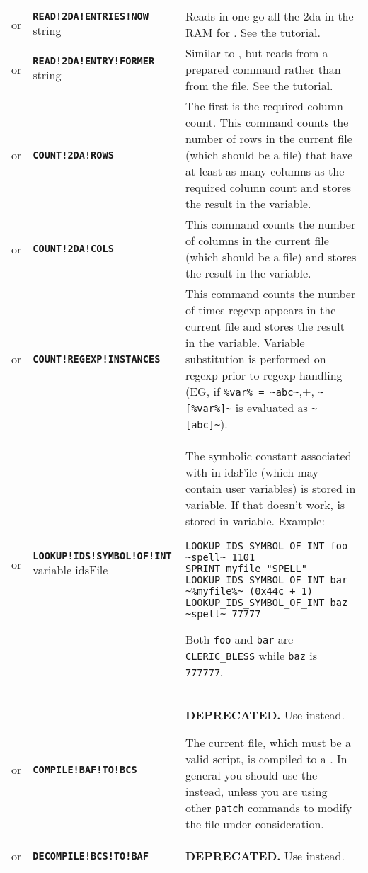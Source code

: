 \documentclass{article}
\def\ttref#1{\ahrefloc{#1}{\tt #1}}
\def\DEFINE#1{{\tt \bf #1}\label{#1}\index{#1}}
\def\DEFSYN#1{{\tt \bf #1}\index{#1}}
\def\t#1{{\tt #1}}
\begin{document}
\begin{tabular}{cp{10in}|p{10in}}
or & \DEFSYN{READ!2DA!ENTRIES!NOW} string \ttref{value} &
  Reads in one go all the 2da in the RAM for \ttref{READ!2DA!ENTRY!FORMER}. See the
  \ttref{READ!2DA!ENTRIES!NOW} tutorial. \\
or & \DEFSYN{READ!2DA!ENTRY!FORMER} string \ttref{value} \ttref{value} \ttref{variable}
  & Similar to \ttref{READ!2DA!ENTRY}, but reads from a prepared
  \ttref{READ!2DA!ENTRIES!NOW} command rather than from the file.
  See the \ttref{READ!2DA!ENTRY!FORMER} tutorial. \\
or & \DEFINE{COUNT!2DA!ROWS} \ttref{value} \ttref{variable} &
  The first \ttref{value} is the required column count. This command
  counts the number of rows in the current file (which should be a
  \ttref{2DA} file) that have at least as many columns as the required
  column count and stores the result in the variable. \\
or & \DEFINE{COUNT!2DA!COLS} \ttref{variable} &
  This command counts the number of columns in the current file (which should be a
  \ttref{2DA} file) and stores the result in the variable. \\
or & \DEFINE{COUNT!REGEXP!INSTANCES} \ttref{optcase} \ttref{optexact} \ttref{regexp}
    \ttref{variable} &
  This command counts the number of times regexp appears in the current file
  and stores the result in the variable. Variable substitution is performed
  on regexp prior to regexp handling (EG, if \verb+%var% = ~abc~+,
  \verb+~[%var%]~+ is evaluated as \verb+~[abc]~+). \\

or & \DEFINE{LOOKUP!IDS!SYMBOL!OF!INT} variable idsFile \ttref{value} &
  The symbolic constant associated with \ttref{value} in idsFile (which may
  contain user variables) is stored
  in variable. If that doesn't work, \ttref{value} is stored in variable.
  Example:
\begin{verbatim}
LOOKUP_IDS_SYMBOL_OF_INT foo ~spell~ 1101
SPRINT myfile "SPELL"
LOOKUP_IDS_SYMBOL_OF_INT bar ~%myfile%~ (0x44c + 1)
LOOKUP_IDS_SYMBOL_OF_INT baz ~spell~ 77777
\end{verbatim}
  Both \t{foo} and \t{bar} are \t{CLERIC\_BLESS} while \t{baz} is
  \t{777777}. \\

or & \DEFINE{COMPILE!BAF!TO!BCS} &
\textbf{DEPRECATED.} Use \ttref{DECOMPILE!AND!PATCH} instead.

  The current file, which must be a valid \ttref{BAF} script, is compiled
  to a \ttref{BCS}. In general you should use the \ttref{COMPILE}
  \ttref{TP2 Action} instead, unless you are using other \t{patch} commands
  to modify the file under consideration. \\
or & \DEFINE{DECOMPILE!BCS!TO!BAF} &
\textbf{DEPRECATED.} Use \ttref{DECOMPILE!AND!PATCH} instead.


\end{tabular}
\end{document}
